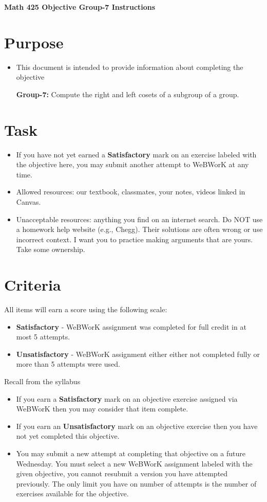 \documentclass[12pt]{article}
\begin{document}
	\begin{center}
		{\Large \bf Math 425 Objective Group-7 Instructions}
	\end{center}
	\section*{Purpose}
	\begin{itemize}
		\item This document is intended to provide information about completing the objective
		
			\textbf{Group-7:} Compute the right and left cosets of a subgroup of a group.

	\end{itemize}
	\section*{Task}
	\begin{itemize}
		\item If you have not yet earned a \textbf{Satisfactory} mark on an exercise labeled with the objective here, you may submit another attempt to WeBWorK at any time.
		\item Allowed resources: our textbook, classmates, your notes, videos linked in Canvas.
		\item Unacceptable resources: anything you find on an internet search. Do NOT use a homework help website (e.g., Chegg). Their solutions are often wrong or use incorrect context.  I want you to practice making arguments that are yours. Take some ownership.
	\end{itemize}
	\section*{Criteria}
	All items will earn a score using the following scale:
	\begin{itemize}
		\item \textbf{Satisfactory} - WeBWorK assignment was completed for full credit in at most 5 attempts.
		\item \textbf{Unsatisfactory} - WeBWorK assignment either either not completed fully or more than 5 attempts were used.
	\end{itemize}
	Recall from the syllabus
	\begin{itemize}
		\item If you earn a \textbf{Satisfactory} mark on an objective exercise assigned via WeBWorK  then you may consider that item complete. 
		\item If you earn an \textbf{Unsatisfactory} mark on an objective exercise then you have not yet completed this objective.
		\item You may submit a new attempt at completing that objective on a future Wednesday. You must select a new WeBWorK assignment labeled with the given objective, you cannot resubmit a version you have attempted previously.  The only limit you have on number of attempts is the number of exercises available for the objective.
	\end{itemize}
	
\end{document}
